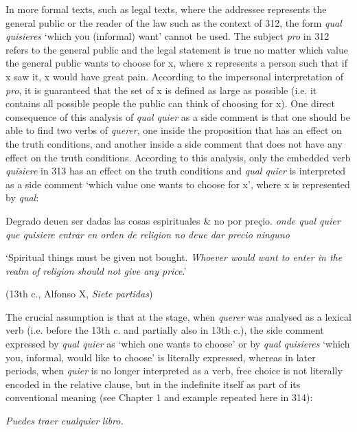 \documentclass[output=paper]{langscibook}
\begin{document}
  In more formal texts, such as legal texts, where the addressee represents the general public or the reader of the law such as the context of 312, the form \textit{qual quisieres} ‘which you (informal) want’ cannot be used. The subject \textit{pro} in 312 refers to the general public and the legal statement is true no matter which value the general public wants to choose for x, where x represents a person such that if x saw it, x would have great pain. According to the impersonal interpretation of \textit{pro}, it is guaranteed that the set of x is defined as large as possible (i.e. it contains all possible people the public can think of choosing for x). One direct consequence of this analysis of \textit{qual quier} as a side comment is that one should be able to find two verbs of \textit{querer}, one inside the proposition that has an effect on the truth conditions, and another inside a side comment that does not have any effect on the truth conditions. According to this analysis, only the embedded verb \textit{quisiere} in 313 has an effect on the truth conditions and \textit{qual quier} is interpreted as a side comment ‘which value one wants to choose for x’, where x is represented by \textit{qual}:

  Degrado deuen ser dadas las cosas espirituales \& no por preçio. \textit{onde qual quier que quisiere entrar en orden de religion no deue dar precio ninguno} 

  ‘Spiritual things must be given not bought. \textit{Whoever would want to enter in the realm of} \textit{religion should not give any price}.’

\begin{styleListParagraph}
\textmd{  (13th c.,}\textmd{ }\textmd{Alfonso X,} \textmd{\textit{Siete partidas}}\textmd{)}
\end{styleListParagraph}

The crucial assumption is that at the stage, when \textit{querer} was analysed as a lexical verb (i.e. before the 13th c. and partially also in 13th c.), the side comment expressed by \textit{qual quier} as ‘which one wants to choose’ or by \textit{qual quisieres} ‘which you, informal, would like to choose’ is literally expressed, whereas in later periods, when \textit{quier} is no longer interpreted as a verb, free choice is not literally encoded in the relative clause, but in the indefinite itself as part of its conventional meaning (see Chapter 1 and example  repeated here in 314):

  \textit{Puedes}  \textit{traer}  \textit{cualquier}  \textit{libro.}    
\end{document}
